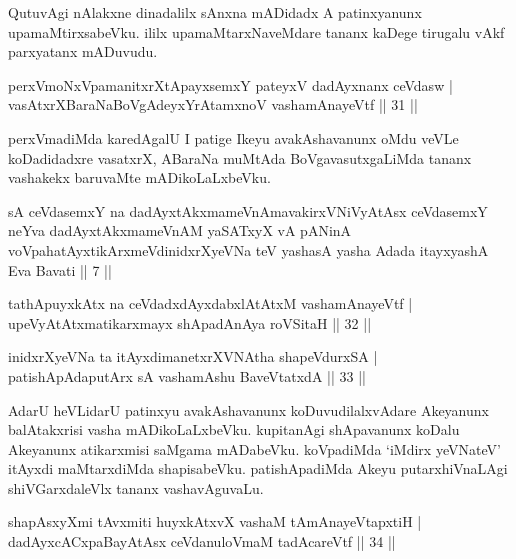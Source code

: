 \begin{artha}
QutuvAgi nAlakxne dinadalilx sAnxna mADidadx A patinxyanunx upamaMtirxsabeVku. ililx upamaMtarxNaveMdare tananx kaDege tirugalu vAkf parxyatanx mADuvudu.
\end{artha}

\begin{shl}
perxVmoNxVpamanitxrXtA\s payxsemxY pateyxV dadAyxnanx ceVdasw | \\
vasAtxrXBaraNaBoVgAdeyxYrAtamxnoV vashamAnayeVtf \hfill|| 31 ||  
\end{shl}

\begin{artha}
perxVmadiMda karedAgalU I patige Ikeyu avakAshavanunx oMdu veVLe 
koDadidadxre vasatxrX, ABaraNa muMtAda BoVgavasutxgaLiMda tananx 
vashakekx baruvaMte mADikoLaLxbeVku.
\end{artha}

\begin{kandikeshl}
sA ceVdasemxY na dadAyxtAkxmameVnAmavakirxVNiVyAtAsx ceVdasemxY neYva dadAyxtAkxmameVnAM yaSATxyX vA pANinA voVpahatAyxtikArxmeVdinidxrXyeVNa teV yashasA yasha Adada itayxyashA Eva Bavati || 7 ||
\end{kandikeshl}

\begin{shl}
tathA\s puyxkAtx na ceVdadxdAyxdabxlAtAtxM vashamAnayeVtf | \\
upeVyAtAtxmatikarxmayx shApadAnAya roVSitaH \hfill|| 32 || 
\end{shl}

\begin{shl}
inidxrXyeVNa ta itAyxdimanetxrXVNAtha shapeVdurxSA | \\
patishApAdaputArx sA vashamAshu BaveVtatxdA \hfill|| 33 || 
\end{shl}

\begin{artha}
AdarU heVLidarU patinxyu avakAshavanunx koDuvudilalxvAdare Akeyanunx 
balAtakxrisi vasha mADikoLaLxbeVku. kupitanAgi shApavanunx koDalu 
Akeyanunx atikarxmisi saMgama mADabeVku. koVpadiMda `iMdirx yeVNateV' itAyxdi 
maMtarxdiMda shapisabeVku. patishApadiMda Akeyu putarxhiVnaLAgi 
shiVGarxdaleVlx tananx vashavAguvaLu.
\end{artha}

\begin{shl}
shapAsxyXmi tAvxmiti huyxkAtxvX vashaM tAmAnayeVtapxtiH | \\
dadAyxcACxpaBayAtAsx ceVdanuloVmaM tadA\s \s careVtf \hfill|| 34 || 
\end{shl}

